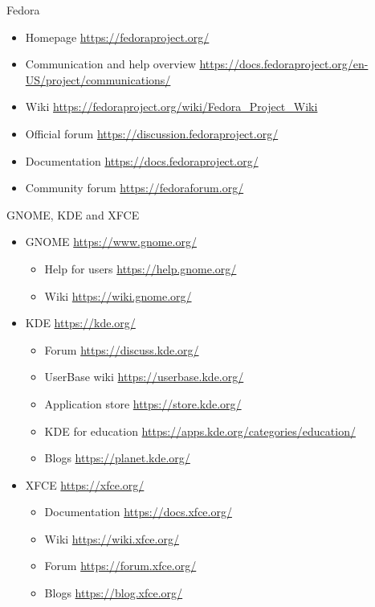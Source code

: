 \documentclass[compress, xelatex, 11pt, xcolor=svgnames, aspectratio=169, url={hyphens, lowtilde}]{beamer}
\begin{document}
\begin{frame}{Fedora}
	\begin{itemize}
		\item Homepage \url{https://fedoraproject.org/}
		\item Communication and help overview \url{https://docs.fedoraproject.org/en-US/project/communications/}
		\item Wiki \url{https://fedoraproject.org/wiki/Fedora_Project_Wiki}
		\item Official forum \url{https://discussion.fedoraproject.org/}
		\item Documentation \url{https://docs.fedoraproject.org/}
		\item Community forum \url{https://fedoraforum.org/}
	\end{itemize}
\end{frame}

\begin{frame}{GNOME, KDE and XFCE}
	\begin{itemize}
		\item GNOME \url{https://www.gnome.org/}
		\begin{itemize}
			\item Help for users \url{https://help.gnome.org/}
			\item Wiki \url{https://wiki.gnome.org/}
		\end{itemize}
		\item KDE \url{https://kde.org/}
		\begin{itemize}
			\item Forum \url{https://discuss.kde.org/}
			\item UserBase wiki \url{https://userbase.kde.org/}
			\item Application store \url{https://store.kde.org/}
			\item KDE for education \url{https://apps.kde.org/categories/education/}
			\item Blogs \url{https://planet.kde.org/}
		\end{itemize}
		\item XFCE \url{https://xfce.org/}
		\begin{itemize}
			\item Documentation \url{https://docs.xfce.org/}
			\item Wiki \url{https://wiki.xfce.org/}
			\item Forum \url{https://forum.xfce.org/}
			\item Blogs \url{https://blog.xfce.org/}
		\end{itemize}
	\end{itemize}
\end{frame}
\end{document}

